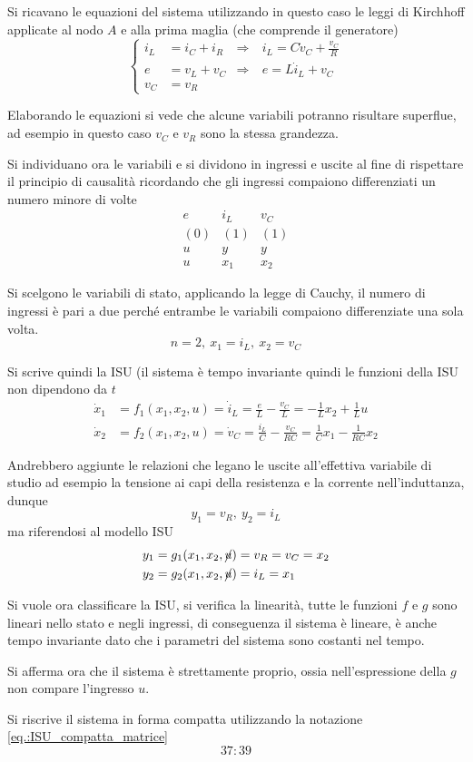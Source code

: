 Si ricavano le equazioni del sistema utilizzando in questo caso le leggi di Kirchhoff applicate al
nodo $A$ e alla prima maglia (che comprende il generatore)
$$\left\{\begin{aligned}
i_L &= i_C + i_R &\Rightarrow&\ i_L = C\dot{v}_C + \frac{v_C}{R}\\
e &= v_L + v_C &\Rightarrow&\ e = L\dot{i}_L + v_C\\
v_C &= v_R
\end{aligned}\right.
$$

Elaborando le equazioni si vede che alcune variabili potranno risultare superflue, ad esempio in
questo caso $v_C$ e $v_R$ sono la stessa grandezza.

Si individuano ora le variabili e si dividono in ingressi e uscite al fine di rispettare il
principio di causalità ricordando che gli ingressi compaiono differenziati un numero minore di volte
$$\begin{matrix}
e& i_L& v_C\\
(0) & (1) & (1)\\
u & y & y\\
u & x_1 & x_2
\end{matrix}
$$

Si scelgono le variabili di stato, applicando la legge di Cauchy, il numero di ingressi è pari a
due perché entrambe le variabili compaiono differenziate una sola volta.
$$
n=2,\ x_1 = i_L,\ x_2 = v_C
$$

Si scrive quindi la ISU (il sistema è tempo invariante quindi le funzioni della ISU non dipendono
da $t$
$$\begin{aligned}
\dot{x}_1 &= f_1(x_1,x_2,u) = \dot{i}_L = \frac{e}{L} - \frac{v_C}{L} = -\frac{1}{L}x_2 +
\frac{1}{L} u\\
\dot{x}_2 &= f_2(x_1,x_2,u) = \dot{v}_C = \frac{i_L}{C} - \frac{v_C}{RC} = \frac{1}{C}x_1 -
\frac{1}{RC}x_2
\end{aligned}$$

Andrebbero aggiunte le relazioni che legano le uscite all'effettiva variabile di studio ad esempio
la tensione ai capi della resistenza e la corrente nell'induttanza, dunque
$$
y_1 = v_R,\ y_2 = i_L
$$
ma riferendosi al modello ISU
$$\begin{aligned}
y_1 &= g_1(x_1,x_2,\cancel{u}) = v_R = v_C = x_2\\
y_2 &= g_2(x_1,x_2,\cancel{u}) = i_L = x_1
\end{aligned}$$

Si vuole ora classificare la ISU, si verifica la linearità, tutte le funzioni $f$ e $g$ sono
lineari nello stato e negli ingressi, di conseguenza il sistema è lineare, è anche tempo invariante
dato che i parametri del sistema sono costanti nel tempo.

Si afferma ora che il sistema è strettamente proprio, ossia nell'espressione della $g$
non compare l'ingresso $u$.

Si riscrive il sistema in forma compatta utilizzando la notazione
\ref{eq.:ISU_compatta_matrice}
$$
37:39
$$

